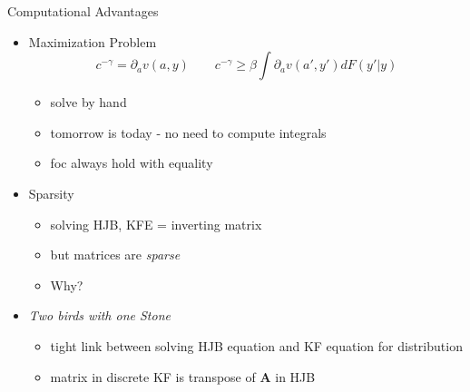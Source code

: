 \documentclass[10pt]{beamer} %
\theoremstyle{plain}
\theoremstyle{definition}
\theoremstyle{remark}
\begin{document}
\begin{frame}{Computational Advantages}{}  
\begin{itemize}
    
    \item Maximization Problem
    \begin{equation*}
        c^{-\gamma} =  \partial_a v( a, y ) \qquad c^{-\gamma} \ge \beta \int \partial_a v( a', y'  ) dF( y'|y )
    \end{equation*}
    \begin{itemize}
        \item solve by hand \smallskip
        \item tomorrow is today - no need to compute integrals \smallskip
        \item foc always hold with equality
    \end{itemize}
    \bigskip

    \item Sparsity 
    \begin{itemize}
        \item solving HJB, KFE = inverting matrix \smallskip
        \item but matrices are \emph{sparse}      \smallskip
        \item Why?
    \end{itemize}    
    \bigskip

    \item \emph{Two birds with one Stone}
    \begin{itemize}
        \item tight link between solving HJB equation and KF equation for distribution \smallskip
        \item matrix in discrete KF is \alert{transpose} of $\mathbf{A}$ in HJB
    \end{itemize}    
    

\end{itemize}
\end{frame}
\end{document}
